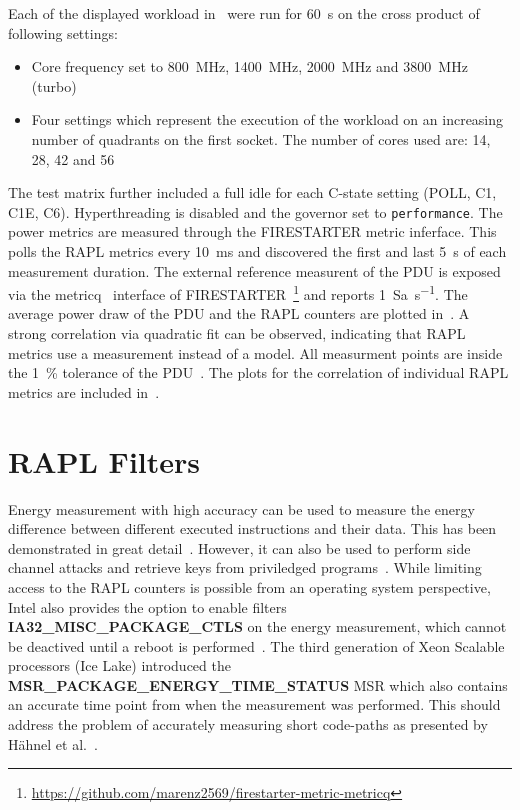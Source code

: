 Each of the displayed workload in~ were run for \SI{60}{\second} on the cross product of following settings:
\begin{itemize}
    \item Core frequency set to \SI{800}{\MHz}, \SI{1400}{\MHz}, \SI{2000}{\MHz} and \SI{3800}{\MHz} (turbo)
    \item Four settings which represent the execution of the workload on an increasing number of quadrants on the first socket.
    The number of cores used are: \SI{14}{}, \SI{28}{}, \SI{42}{} and \SI{56}{}
\end{itemize}
The test matrix further included a full idle for each C-state setting (POLL, C1, C1E, C6).
Hyperthreading is disabled and the governor set to \texttt{performance}.
The power metrics are measured through the FIRESTARTER metric inferface.
This polls the RAPL metrics every \SI{10}{\ms} and discovered the first and last \SI{5}{\second} of each measurement duration.
The external reference measurent of the PDU is exposed via the metricq~\cite{Ilsche_2019_MetricQ} interface of FIRESTARTER~\footnote{\url{https://github.com/marenz2569/firestarter-metric-metricq}} and reports \SI{1}{Sa\per\second}.
The average power draw of the PDU and the RAPL counters are plotted in~.
A strong correlation via quadratic fit can be observed, indicating that RAPL metrics use a measurement instead of a model.
All measurment points are inside the \SI{1}{\percent} tolerance of the PDU~\cite{Raritan_PX2_5528}.
The plots for the correlation of individual RAPL metrics are included in~.

\section{RAPL Filters}
\label{sec:rapl_filters}

Energy measurement with high accuracy can be used to measure the energy difference between different executed instructions and their data.
This has been demonstrated in great detail~\cite{Lucas_2016_AluPower,Schoene_2024_Alder_Lake,Schoene_2021_Zen2}.
However, it can also be used to perform side channel attacks and retrieve keys from priviledged programs~\cite{Lipp_2021_Platypus}.
While limiting access to the RAPL counters is possible from an operating system perspective, Intel also provides the option to enable filters \textbf{IA32\_MISC\_PACKAGE\_CTLS} on the energy measurement, which cannot be deactived until a reboot is performed~\cite[Vol. 4 Table 2-52]{intel_combined_software_developer_manual}.
The third generation of Xeon Scalable processors (Ice Lake) introduced the \textbf{MSR\_PACKAGE\_ENERGY\_TIME\_STATUS} MSR which also contains an accurate time point from when the measurement was performed.
This should address the problem of accurately measuring short code-paths as presented by Hähnel et al.~\cite{Haehnel_2012_RAPL}.

